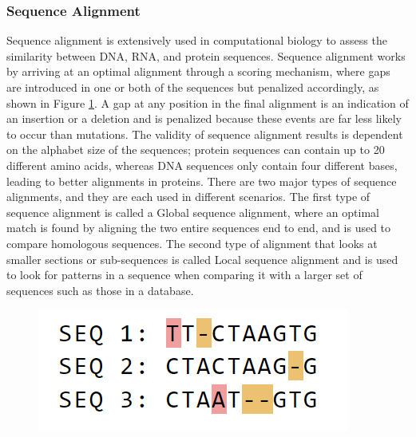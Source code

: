 \subsubsection{Sequence Alignment}
Sequence alignment is extensively used in computational biology to assess the similarity between DNA, RNA, and protein sequences. Sequence alignment works by arriving at an optimal alignment through a scoring mechanism, where gaps are introduced in one or both of the sequences but penalized accordingly, as shown in Figure \ref{fig:ch_2_sequence_alignment_multi}. A gap at any position in the final alignment is an indication of an insertion or a deletion and is penalized because these events are far less likely to occur than mutations. The validity of sequence alignment results is dependent on the alphabet size of the sequences; protein sequences can contain up to 20 different amino acids, whereas DNA sequences only contain four different bases, leading to better alignments in proteins. There are two major types of sequence alignments, and they are each used in different scenarios. The first type of sequence alignment is called a Global sequence alignment, where an optimal match is found by aligning the two entire sequences end to end, and is used to compare homologous sequences. The second type of alignment that looks at smaller sections or sub-sequences is called Local sequence alignment and is used to look for patterns in a sequence when comparing it with a larger set of sequences such as those in a database. 

\begin{figure}
  \centering
  \includegraphics[width=.45\linewidth]{images/ch_2_sequence_alignment_multi.PNG}
  \label{fig:ch_2_sequence_alignment_multi}
\end{figure}


